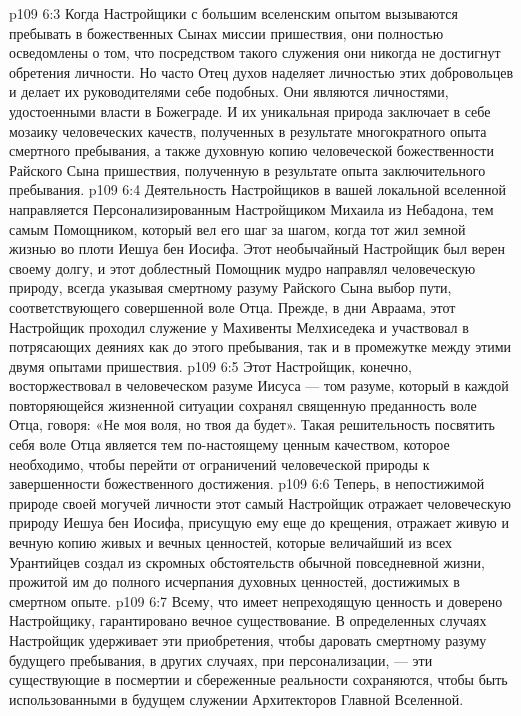 \vs p109 6:3 Когда Настройщики с большим вселенским опытом вызываются пребывать в божественных Сынах миссии пришествия, они полностью осведомлены о том, что посредством такого служения они никогда не достигнут обретения личности. Но часто Отец духов наделяет личностью этих добровольцев и делает их руководителями себе подобных. Они являются личностями, удостоенными власти в Божеграде. И их уникальная природа заключает в себе мозаику человеческих качеств, полученных в результате многократного опыта смертного пребывания, а также духовную копию человеческой божественности Райского Сына пришествия, полученную в результате опыта заключительного пребывания.
\vs p109 6:4 Деятельность Настройщиков в вашей локальной вселенной направляется Персонализированным Настройщиком Михаила из Небадона, тем самым Помощником, который вел его шаг за шагом, когда тот жил земной жизнью во плоти Иешуа бен Иосифа. Этот необычайный Настройщик был верен своему долгу, и этот доблестный Помощник мудро направлял человеческую природу, всегда указывая смертному разуму Райского Сына выбор пути, соответствующего совершенной воле Отца. Прежде, в дни Авраама, этот Настройщик проходил служение у Махивенты Мелхиседека и участвовал в потрясающих деяниях как до этого пребывания, так и в промежутке между этими двумя опытами пришествия.
\vs p109 6:5 Этот Настройщик, конечно, восторжествовал в человеческом разуме Иисуса --- том разуме, который в каждой повторяющейся жизненной ситуации сохранял священную преданность воле Отца, говоря: «Не моя воля, но твоя да будет». Такая решительность посвятить себя воле Отца является тем по\hyp{}настоящему ценным качеством, которое необходимо, чтобы перейти от ограничений человеческой природы к завершенности божественного достижения.
\vs p109 6:6 Теперь, в непостижимой природе своей могучей личности этот самый Настройщик отражает человеческую природу Иешуа бен Иосифа, присущую ему еще до крещения, отражает живую и вечную копию живых и вечных ценностей, которые величайший из всех Урантийцев создал из скромных обстоятельств обычной повседневной жизни, прожитой им до полного исчерпания духовных ценностей, достижимых в смертном опыте.
\vs p109 6:7 Всему, что имеет непреходящую ценность и доверено Настройщику, гарантировано вечное существование. В определенных случаях Настройщик удерживает эти приобретения, чтобы даровать смертному разуму будущего пребывания, в других случаях, при персонализации, --- эти существующие в посмертии и сбереженные реальности сохраняются, чтобы быть использованными в будущем служении Архитекторов Главной Вселенной.
